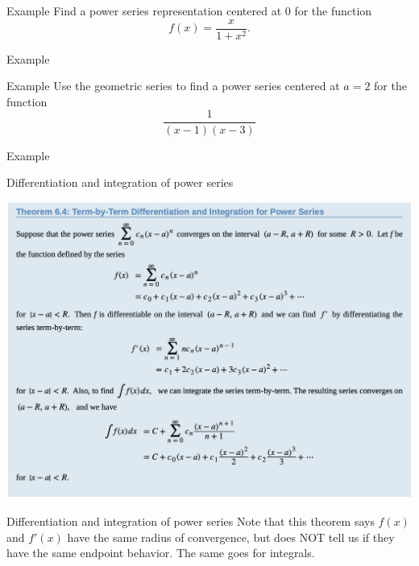 \documentclass[presentation]{beamer}
\begin{document}
\begin{frame}[label={sec:org7b9bcc1}]{Example}
Find a power series representation centered at 0 for the function
\[f(x) = \frac{x}{1 + x^2}.\]
\vspace{10in}
\end{frame}

\begin{frame}[label={sec:org6363580}]{Example}
\end{frame}

\begin{frame}[label={sec:orgcb4d7cf}]{Example}
Use the geometric series to find a power series centered at \(a = 2\)
for the function \[\frac{1}{\left( x-1 \right)\left( x-3 \right)}\]

\vspace{10in}
\end{frame}

\begin{frame}[label={sec:org6e981b4}]{Example}
\end{frame}

\begin{frame}[label={sec:org8211792}]{Differentiation and integration of power series}
\begin{center}
\begin{center}
\includegraphics[width=.9\linewidth]{../img/tbyt.png}
\end{center}
\end{center}
\end{frame}

\begin{frame}[label={sec:orgc1c3ee4}]{Differentiation and integration of power series}
Note that this theorem says \(f(x)\) and \(f'(x)\) have the same
radius of convergence, but does NOT tell us if they have the same
endpoint behavior. The same goes for integrals.
\end{frame}
\end{document}
